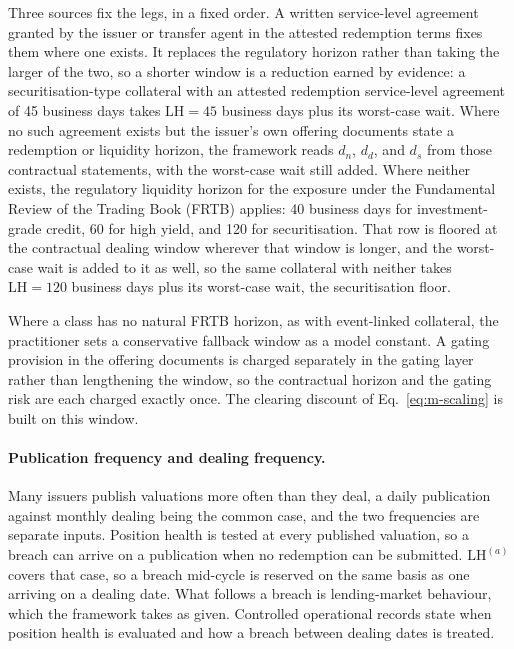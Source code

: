 Three sources fix the legs, in a fixed order. A written service-level agreement granted by the issuer or transfer agent in the attested redemption terms fixes them where one exists. It replaces the regulatory horizon rather than taking the larger of the two, so a shorter window is a reduction earned by evidence: a securitisation-type collateral with an attested redemption service-level agreement of 45 business days takes $\mathrm{LH}=45$ business days plus its worst-case wait. Where no such agreement exists but the issuer's own offering documents state a redemption or liquidity horizon, the framework reads $d_n$, $d_d$, and $d_s$ from those contractual statements, with the worst-case wait still added. Where neither exists, the regulatory liquidity horizon for the exposure under the Fundamental Review of the Trading Book (FRTB) \cite{bcbs_frtb_d457} applies: 40 business days for investment-grade credit, 60 for high yield, and 120 for securitisation. That row is floored at the contractual dealing window wherever that window is longer, and the worst-case wait is added to it as well, so the same collateral with neither takes $\mathrm{LH}=120$ business days plus its worst-case wait, the securitisation floor.

Where a class has no natural FRTB horizon, as with event-linked collateral, the practitioner sets a conservative fallback window as a model constant. A gating provision in the offering documents is charged separately in the gating layer rather than lengthening the window, so the contractual horizon and the gating risk are each charged exactly once. The clearing discount of Eq.~\eqref{eq:m-scaling} is built on this window.

\paragraph{Publication frequency and dealing frequency.} Many issuers publish valuations more often than they deal, a daily publication against monthly dealing being the common case, and the two frequencies are separate inputs. Position health is tested at every published valuation, so a breach can arrive on a publication when no redemption can be submitted. $\mathrm{LH}^{(a)}$ covers that case, so a breach mid-cycle is reserved on the same basis as one arriving on a dealing date. What follows a breach is lending-market behaviour, which the framework takes as given. Controlled operational records state when position health is evaluated and how a breach between dealing dates is treated.

